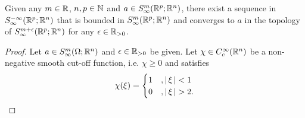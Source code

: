 \documentclass[12pt]{article}
\begin{document}
\begin{flemma}
    Given any $m \in {\ensuremath {\mathbb R}}$, $n, p \in {\ensuremath {\mathbb N}}$ and $a \in S^{m}_\infty({\mathbb R}^p; {\mathbb R}^n)$, there exist a sequence in $S^{-\infty}_\infty({\mathbb R}^p; {\mathbb R}^n)$ that is bounded in $S^{m}_\infty({\mathbb R}^p; {\mathbb R}^n)$ and converges to $a$ in the topology of $S^{m + \epsilon}_\infty({\mathbb R}^p; {\mathbb R}^n)$ for any $\epsilon \in {\ensuremath {\mathbb R}}_{> 0}$. 
\end{flemma}
\begin{proof}
    Let $a \in S^{m}_\infty(\Omega; {\mathbb R}^n)$ and $\epsilon \in {\ensuremath {\mathbb R}}_{>0}$ be given. Let $\chi \in C^\infty_c({\mathbb R}^n)$ be a non-negative smooth cut-off function, i.e. $\chi \geq 0$  and satisfies
    \begin{align*}
        \chi(\xi) = 
        \begin{cases}
            1 & ,\left|\, \xi\,\right| < 1 \\
            0 & ,\left|\, \xi\,\right| > 2. 
        \end{cases}
    \end{align*}
    

\end{proof}
\end{document}
